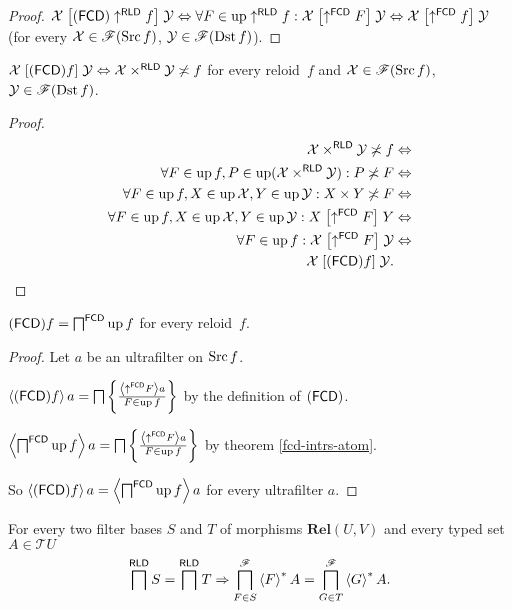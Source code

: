 \begin{proof}
$\mathcal{X}\mathrel{\left[(\mathsf{FCD})\uparrow^{\mathsf{RLD}}f\right]}\mathcal{Y}\Leftrightarrow\forall F\in\operatorname{up}\uparrow^{\mathsf{RLD}}f:\mathcal{X}\mathrel{\left[\uparrow^{\mathsf{FCD}}F\right]}\mathcal{Y}\Leftrightarrow\mathcal{X}\mathrel{\left[\uparrow^{\mathsf{FCD}}f\right]}\mathcal{Y}$
(for every $\mathcal{X}\in\mathscr{F}(\operatorname{Src} f)$, $\mathcal{Y}\in\mathscr{F}(\operatorname{Dst} f)$).\end{proof}
\begin{thm}
$\mathcal{X}\mathrel{\left[(\mathsf{FCD}) f\right]}\mathcal{Y}\Leftrightarrow\mathcal{X}\times^{\mathsf{RLD}}\mathcal{Y}\not\asymp f$
for every reloid~$f$ and $\mathcal{X}\in\mathscr{F}(\operatorname{Src} f)$,
$\mathcal{Y}\in\mathscr{F}(\operatorname{Dst} f)$.\end{thm}
\begin{proof}
~
\begin{align*}
\mathcal{X}\times^{\mathsf{RLD}}\mathcal{Y}\not\asymp f & \Leftrightarrow\\
\forall F\in\operatorname{up} f,P\in\operatorname{up}(\mathcal{X}\times^{\mathsf{RLD}}\mathcal{Y}):P\not\asymp F & \Leftrightarrow\\
\forall F\in\operatorname{up} f,X\in\operatorname{up}\mathcal{X},Y\in\operatorname{up}\mathcal{Y}:X\times Y\not\asymp F & \Leftrightarrow\\
\forall F\in\operatorname{up} f,X\in\operatorname{up}\mathcal{X},Y\in\operatorname{up}\mathcal{Y}:X\mathrel{\left[\uparrow^{\mathsf{FCD}}F\right]}Y & \Leftrightarrow\\
\forall F\in\operatorname{up} f:\mathcal{X}\mathrel{\left[\uparrow^{\mathsf{FCD}}F\right]}\mathcal{Y} & \Leftrightarrow\\
\mathcal{X}\mathrel{\left[(\mathsf{FCD}) f\right]}\mathcal{Y}.
\end{align*}
\end{proof}
\begin{thm}
\label{fcd-as-meet}$(\mathsf{FCD}) f=\bigsqcap^{\mathsf{FCD}}\operatorname{up} f$ for
every reloid~$f$.\end{thm}
\begin{proof}
Let $a$ be an ultrafilter on $\operatorname{Src} f$.

$\left\langle (\mathsf{FCD}) f\right\rangle a=\bigsqcap\left\{ \frac{\left\langle \uparrow^{\mathsf{FCD}}F\right\rangle a}{F\in\operatorname{up} f}\right\}$
by the definition of $(\mathsf{FCD})$.

$\left\langle \bigsqcap^{\mathsf{FCD}}\operatorname{up} f\right\rangle a=\bigsqcap\left\{ \frac{\left\langle \uparrow^{\mathsf{FCD}}F\right\rangle a}{F\in\operatorname{up} f}\right\}$
by theorem \ref{fcd-intrs-atom}.

So $\left\langle (\mathsf{FCD}) f\right\rangle a=\left\langle \bigsqcap^{\mathsf{FCD}}\operatorname{up} f\right\rangle a$ for
every ultrafilter $a$.\end{proof}
\begin{lem}
\label{base-intrs-lem}For every two filter bases $S$ and $T$ of
morphisms $\mathbf{Rel}(U,V)$ and every typed set $A\in\mathscr{T}U$
\[
\bigsqcap^{\mathsf{RLD}}S=\bigsqcap^{\mathsf{RLD}}T\Rightarrow\bigsqcap_{F\in S}^{\mathscr{F}}\left\langle F\right\rangle ^{\ast}A=\bigsqcap_{G\in T}^{\mathscr{F}}\left\langle G\right\rangle ^{\ast}A.
\]
\end{lem}

